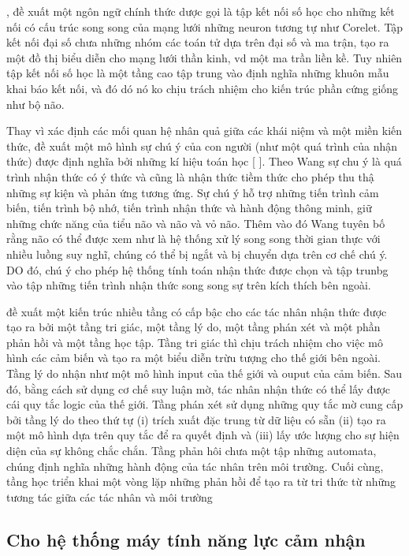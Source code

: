 \documentclass{article}
\begin{document}
,  đề xuất một ngôn ngữ chính thức dược gọi là tập kết nối số học cho những kết nối có cấu trúc song song của mạng lưới những neuron tương tự như Corelet. Tập kết nối đại số chưa những nhóm các toán tử dựa trên đại số và ma trận, tạo ra một đồ thị biểu diễn cho mạng lưới thần kinh, vd một ma trần liền kề. Tuy nhiên tập kết nối số học là một tầng cao tập trung vào định nghĩa những khuôn mẫu khai báo kết nối, và đó dó nó ko chịu trách nhiệm cho kiến trúc phần cứng giống như bộ não.

Thay vì xác định các mối quan hệ nhân quả giữa các khái niệm và một miền kiến thức,  đề xuất một mô hình sự chú ý của con người (như một quá trình của nhận thức) được định nghĩa bởi những kí hiệu toán học [ ]. Theo Wang sự chu ý là quá trình nhận thức có ý thức và cũng là nhận thức tiềm thức cho phép thu thậ những sự kiện và phản ứng tương ứng. Sự chú ý hỗ trợ những tiến trình cảm biến, tiến trình bộ nhớ, tiến trình nhận thức và hành động thông minh, giữ những chức năng của tiểu não và não và vỏ não. Thêm vào đó Wang tuyên bố rằng não có thể được xem như là hệ thống xử lý song song thời gian thực với nhiều luồng suy nghĩ, chúng có thể bị ngắt và bị chuyển dựa trên cơ chế chú ý. DO đó, chú ý cho phép hệ thống tính toán nhận thức được chọn và tập trunbg vào tập những tiến trình nhận thức song song sự trên kích thích bên ngoài.

 đề xuất một kiến trúc nhiều tầng có cấp bậc cho các tác nhân nhận thức được tạo ra bởi một tầng tri giác, một tầng lý do, một tầng phán xét và một phần phản hồi và một tầng học tập. Tầng tri giác thì chịu trách nhiệm cho việc mô hình các cảm biến và tạo ra một biểu diễn trừu tượng cho thế giới bên ngoài. Tầng lý do nhận như một mô hình input của thế giới và ouput của cảm biến. Sau đó, bằng cách sử dụng cơ chế suy luận mờ, tác nhân nhận thức có thể lấy được cái quy tắc logic của thế giới. Tầng phán xét sử dụng những quy tắc mờ cung cấp bởi tầng lý do theo thứ tự (i) trích xuất đặc trung từ dữ liệu có sẵn (ii) tạo ra một mô hình dựa trên quy tắc để ra quyết định và (iii) lấy ước lượng cho sự hiện diện của sự không chắc chắn. Tầng phản hôi chưa một tập những automata, chúng định nghĩa những hành động của tác nhân trên môi trường. Cuối cùng, tầng học triển khai một vòng lặp những phản hồi để tạo ra từ tri thức từ những tương tác giữa các tác nhân và môi trường

\subsection{Cho hệ thống máy tính năng lực cảm nhận} \label{sec:3c-feeling}
\end{document}
